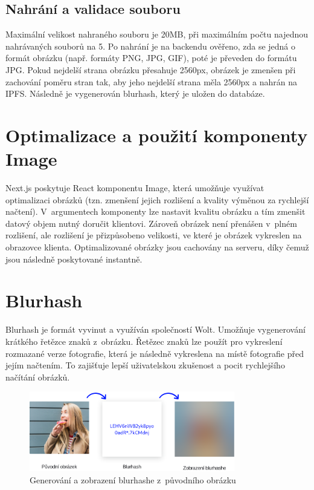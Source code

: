 \documentclass[12pt, a4paper,
  oneside,      %
]{report}
\begin{document}
\subsection{Nahrání a validace souboru} Maximální velikost nahraného souboru je 20MB, při maximálním počtu najednou nahrávaných souborů na 5.  Po nahrání je na backendu ověřeno, zda se jedná o formát obrázku (např. formáty PNG, JPG, GIF), poté je převeden do formátu JPG. Pokud nejdelší strana obrázku přesahuje 2560px, obrázek je zmenšen při zachování poměru stran tak, aby jeho nejdelší strana měla 2560px a nahrán na IPFS. Následně je vygenerován blurhash, který je uložen do databáze.
\section{Optimalizace a použití komponenty Image}\label{subsubsection:nextImageComponent}
Next.js poskytuje React komponentu Image, která umožňuje využívat optimalizaci obrázků (tzn. zmenšení jejich rozlišení a kvality výměnou za rychlejší načtení). V~argumentech komponenty lze nastavit kvalitu obrázku a tím zmenšit datový objem nutný doručit klientovi. Zároveň obrázek není přenášen v~plném rozlišení, ale rozlišení je přizpůsobeno velikosti, ve které je obrázek vykreslen na obrazovce klienta. Optimalizované obrázky jsou cachovány na serveru, díky čemuž jsou následně poskytované instantně. \cite{nextImage}
\section{Blurhash}\label{subsection:blurhash}
Blurhash je formát vyvinut a využíván společností Wolt. Umožňuje vygenerování krátkého řetězce znaků z~obrázku. Řetězec znaků lze použít pro vykreslení rozmazané verze fotografie, která je následně vykreslena na místě fotografie před jejím načtením. To zajišťuje lepší uživatelskou zkušenost a pocit rychlejšího načítání obrázků. \cite{blurhash}\cite{blurhashWoltBlog}

\begin{figure}[h]
	\centering
	\includegraphics[width=0.8\textwidth]{images/blurhash.png}
	\caption{Generování a zobrazení blurhashe z~původního obrázku \cite{blurhashScreenshot}}
\end{figure}
\end{document}
